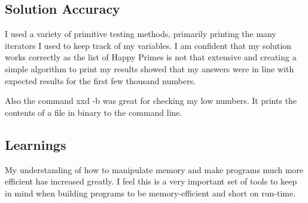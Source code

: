 \documentclass[letterpaper,10pt,titlepage]{article}
\begin{document}
\subsection{Solution Accuracy}
I used a variety of primitive testing methods, primarily printing the many iterators I used to keep track of my variables.
I am confident that my solution works correctly as the list of Happy Primes is not that extensive and creating a simple algorithm
to print my results showed that my answers were in line with expected results for the first few thousand numbers.

Also the command xxd -b was great for checking my low numbers. It prints the contents of a file in binary to the command line.

\subsection{Learnings}
My understanding of how to manipulate memory and make programs much more efficient has increased greatly.
I feel this is a very important set of tools to keep in mind when building programs to be memory-efficient and short on run-time.
\end{document}
